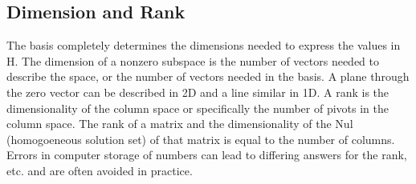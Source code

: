 \documentclass[12pt]{article}
\begin{document}
\subsection{Dimension and Rank}
The basis completely determines the dimensions needed to express the values in H. The dimension of a nonzero subspace is the number of vectors needed to describe the space, %
or the number of vectors needed in the basis. A plane through the zero vector can be described in 2D and a line similar in 1D. A rank is the dimensionality of the column %
space or specifically the number of pivots in the column space. The rank of a matrix and the dimensionality of the Nul (homogoeneous solution set) of that matrix is %
equal to the number of columns. Errors in computer storage of numbers can lead to differing answers for the rank, etc. and are often avoided in practice. 
\end{document}
